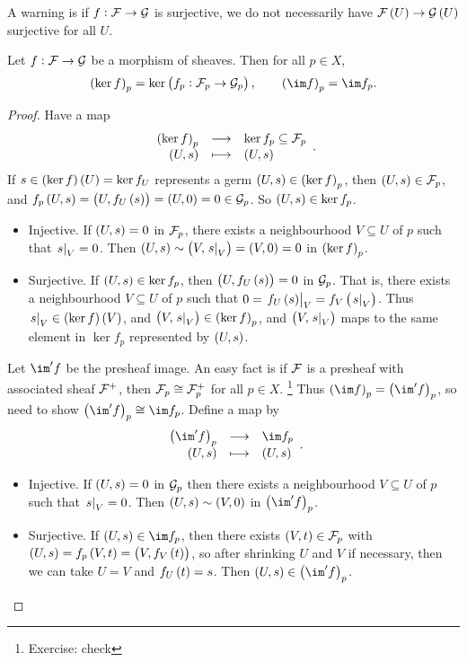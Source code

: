 A warning is if $ f : \mathcal{F} \to \mathcal{G} $ is surjective, we do not necessarily have $ \FFF\br{U} \to \GGG\br{U} $ surjective for all $ U $.

\begin{lemma}
Let $ f : \mathcal{F} \to \mathcal{G} $ be a morphism of sheaves. Then for all $ p \in X $,
$$ \br{\ker f}_p = \ker \br{f_p : \FFF_p \to \GGG_p}, \qquad \br{\im f}_p = \im f_p. $$
\end{lemma}

\begin{proof}
Have a map
$$ \function{\br{\ker f}_p}{\ker f_p \subseteq \FFF_p}{\br{U, s}}{\br{U, s}}. $$
If $ s \in \br{\ker f}\br{U} = \ker f_U $ represents a germ $ \br{U, s} \in \br{\ker f}_p $, then $ \br{U, s} \in \FFF_p $, and $ f_p\br{U, s} = \br{U, f_U\br{s}} = \br{U, 0} = 0 \in \GGG_p $. So $ \br{U, s} \in \ker f_p $.
\begin{itemize}
\item Injective. If $ \br{U, s} = 0 $ in $ \mathcal{F}_p $, there exists a neighbourhood $ V \subseteq U $ of $ p $ such that $ \left. s \right|_V = 0 $. Then $ \br{U, s} \sim \br{V, \eval{s}_V} = \br{V, 0} = 0 $ in $ \br{\ker f}_p $.
\item Surjective. If $ \br{U, s} \in \ker f_p $, then $ \br{U, f_U\br{s}} = 0 $ in $ \mathcal{G}_p $. That is, there exists a neighbourhood $ V \subseteq U $ of $ p $ such that $ 0 = \eval{f_U\br{s}}_V = f_V\br{\eval{s}_V} $. Thus $ \eval{s}_V \in \br{\ker f}\br{V} $, and $ \br{V, \eval{s}_V} \in \br{\ker f}_p $, and $ \br{V, \eval{s}_V} $ maps to the same element in $ \ker f_p $ represented by $ \br{U, s} $.
\end{itemize}

\pagebreak

Let $ \im' f $ be the presheaf image. An easy fact is if $ \mathcal{F} $ is a presheaf with associated sheaf $ \mathcal{F}^+ $, then $ \mathcal{F}_p \cong \mathcal{F}_p^+ $ for all $ p \in X $. \footnote{Exercise: check} Thus $ \br{\im f}_p = \br{\im' f}_p $, so need to show $ \br{\im' f}_p \cong \im f_p $. Define a map by
$$ \function{\br{\im' f}_p}{\im f_p}{\br{U, s}}{\br{U, s}}. $$
\begin{itemize}
\item Injective. If $ \br{U, s} = 0 $ in $ \mathcal{G}_p $ then there exists a neighbourhood $ V \subseteq U $ of $ p $ such that $ \left. s \right|_V = 0 $. Then $ \br{U, s} \sim \br{V, 0} $ in $ \br{\im' f}_p $.
\item Surjective. If $ \br{U, s} \in \im f_p $, then there exists $ \br{V, t} \in \FFF_p $ with $ \br{U, s} = f_p\br{V, t} = \br{V, f_V\br{t}} $, so after shrinking $ U $ and $ V $ if necessary, then we can take $ U = V $ and $ f_U\br{t} = s $. Then $ \br{U, s} \in \br{\im' f}_p $.
\end{itemize}
\end{proof}

